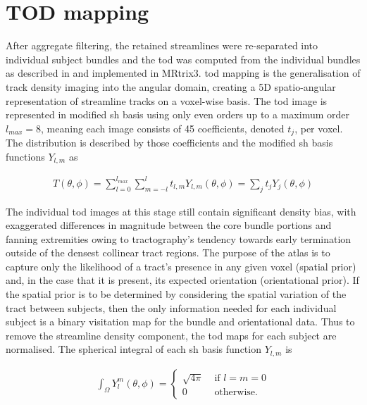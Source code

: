 \section{TOD mapping}

After aggregate filtering, the retained streamlines were re-separated into individual subject bundles and the \gls{tod} was computed from the individual bundles as described in \textcite{Dhollander2014} and implemented in MRtrix3. \autocite{Tournier2019}
\gls{tod} mapping is the generalisation of track density imaging into the angular domain, creating a 5D spatio-angular representation of streamline tracks on a voxel-wise basis.
The \gls{tod} image is represented in modified \gls{sh} basis \autocite{Descoteaux2006} using only even orders up to a maximum order $l_{max}=8$, meaning each image consists of 45 coefficients, denoted $t_j$, per voxel.
The distribution is described by those coefficients and the modified \gls{sh} basis functions $Y_{l,m}$ \autocite{Descoteaux2006} as

\begin{align}
  T(\theta, \phi) = \sum_{l=0}^{l_{max}} \sum_{m=-l}^l t_{l,m} Y_{l,m}(\theta, \phi) = \sum_j t_jY_j(\theta, \phi)
\end{align}

The individual \gls{tod} images at this stage still contain significant density bias, with exaggerated differences in magnitude between the core bundle portions and fanning extremities owing to tractography's tendency towards early termination outside of the densest collinear tract regions.\autocite{Smith2013,Calamante2015,Rheault2020}
The purpose of the atlas is to capture only the likelihood of a tract's presence in any given voxel (spatial prior) and, in the case that it is present, its expected orientation (orientational prior).
If the spatial prior is to be determined by considering the spatial variation of the tract between subjects, then the only information needed for each individual subject is a binary visitation map for the bundle and orientational data.
Thus to remove the streamline density component, the \gls{tod} maps for each subject are normalised.
The spherical integral of each \gls{sh} basis function $Y_{l,m}$ is

\begin{align}
  \int_{\Omega} Y^m_l(\theta, \phi) = \begin{cases}
   \sqrt{4\pi} & \text{ if } l=m=0\\
   0 & \text{ otherwise. }
  \end{cases}
\end{align}

